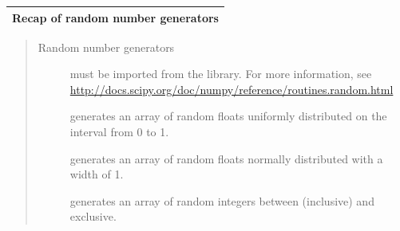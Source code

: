 \documentclass[letterpaper,10pt,english]{sphinxmanual}
\begin{document}
\begin{tabulary}{\linewidth}{|L|}
\hline

\textbf{Recap of random number generators}
\\
\hline\end{tabulary}

\begin{quote}
\begin{description}
\item[{Random number generators}] \leavevmode
must be imported from the  library.  For more information, see \href{http://docs.scipy.org/doc/numpy/reference/routines.random.html}{http://docs.scipy.org/doc/numpy/reference/routines.random.html}

\item[{}] \leavevmode
generates an array of  random floats uniformly distributed on the interval from 0 to 1.

\item[{}] \leavevmode
generates an array of  random floats normally distributed with a width of 1.

\item[{}] \leavevmode
generates an array of  random integers between  (inclusive) and  exclusive.

\end{description}
\end{quote}
\newpage
\end{document}
